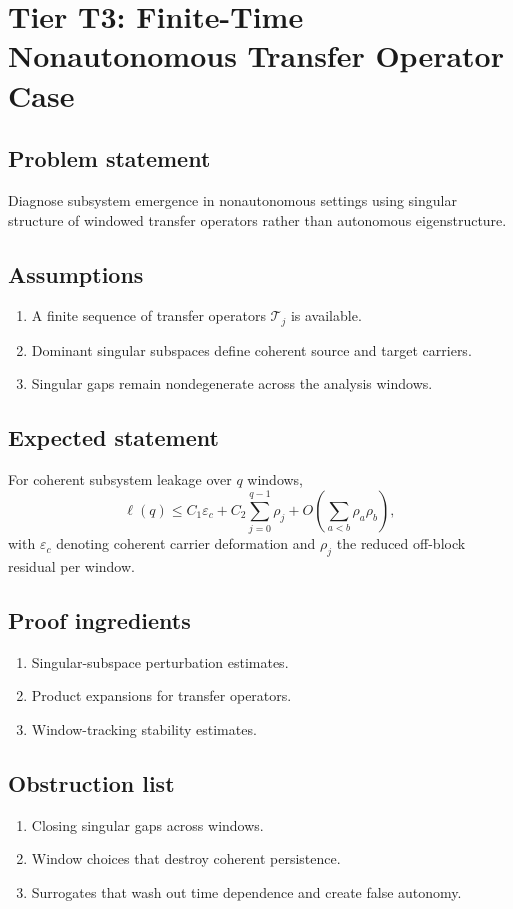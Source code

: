 \section{Tier T3: Finite-Time Nonautonomous Transfer Operator Case}

\subsection{Problem statement}
Diagnose subsystem emergence in nonautonomous settings using singular structure of windowed transfer operators rather than autonomous eigenstructure.

\subsection{Assumptions}
\begin{enumerate}
\item A finite sequence of transfer operators $\mathcal{T}_j$ is available.
\item Dominant singular subspaces define coherent source and target carriers.
\item Singular gaps remain nondegenerate across the analysis windows.
\end{enumerate}

\subsection{Expected statement}
For coherent subsystem leakage over $q$ windows,
\[
\ell(q) \le C_1 \varepsilon_c + C_2 \sum_{j=0}^{q-1} \rho_j + O\!\left(\sum_{a<b} \rho_a \rho_b\right),
\]
with $\varepsilon_c$ denoting coherent carrier deformation and $\rho_j$ the reduced off-block residual per window.

\subsection{Proof ingredients}
\begin{enumerate}
\item Singular-subspace perturbation estimates.
\item Product expansions for transfer operators.
\item Window-tracking stability estimates.
\end{enumerate}

\subsection{Obstruction list}
\begin{enumerate}
\item Closing singular gaps across windows.
\item Window choices that destroy coherent persistence.
\item Surrogates that wash out time dependence and create false autonomy.
\end{enumerate}

